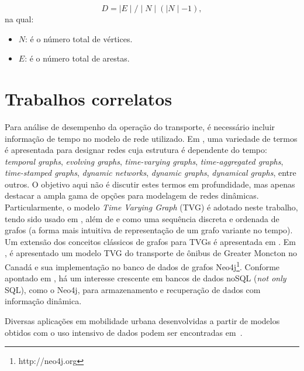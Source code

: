  \begin{equation}
     D = \mid E \mid / \mid N \mid ( \mid N \mid -1),
 \end{equation} 
na qual:

 \begin{itemize}
 \item $N$: é o número total de vértices.
 \item $E$: é o número total de arestas.
\end{itemize}  

\section{Trabalhos correlatos} \label{sec:fund}

\textcolor{courb2020}{
Para análise de desempenho da operação do transporte, é necessário incluir informação de tempo no modelo de rede utilizado. Em \cite{hol:12}, uma variedade de termos é apresentada para designar redes cuja estrutura é dependente do tempo: \emph{temporal graphs}, \emph{evolving graphs}, \emph{time-varying graphs}, \emph{time-aggregated graphs}, \emph{time-stamped graphs}, \emph{dynamic networks}, \emph{dynamic graphs}, \emph{dynamical graphs}, entre outros. O objetivo aqui não é discutir estes termos em profundidade, mas apenas destacar a ampla gama de opções para modelagem de redes dinâmicas. Particularmente, o modelo \emph{Time Varying Graph} (TVG) é adotado neste trabalho, tendo sido usado em \cite{sant:09}, além de \cite{tang:10} e \cite{lat:10} como uma sequência discreta e ordenada de grafos (a forma mais intuitiva de representação de um grafo variante no tempo). Um extensão dos conceitos clássicos de grafos para TVGs é apresentada em \cite{lat:12}. Em \cite{wach:19}, é apresentado um modelo TVG do transporte de ônibus de Greater Moncton no Canadá e sua implementação no banco de dados de grafos Neo4j\footnote{http://neo4j.org}. Conforme apontado em \cite{vick:10}, há um interesse crescente em bancos de dados noSQL (\emph{not only} SQL), como o Neo4j, para armazenamento e recuperação de dados com informação dinâmica.
}


Diversas aplicações em mobilidade urbana desenvolvidas a partir de modelos obtidos com o uso intensivo de dados podem ser encontradas em~\cite{Rosa2020}.

